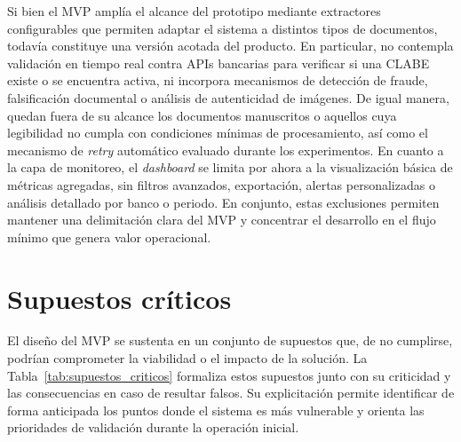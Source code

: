 Si bien el MVP amplía el alcance del prototipo mediante extractores configurables que permiten adaptar el sistema a distintos tipos de documentos, todavía constituye una versión acotada del producto. En particular, no contempla validación en tiempo real contra APIs bancarias para verificar si una CLABE existe o se encuentra activa, ni incorpora mecanismos de detección de fraude, falsificación documental o análisis de autenticidad de imágenes. De igual manera, quedan fuera de su alcance los documentos manuscritos o aquellos cuya legibilidad no cumpla con condiciones mínimas de procesamiento, así como el mecanismo de \textit{retry} automático evaluado durante los experimentos. En cuanto a la capa de monitoreo, el \textit{dashboard} se limita por ahora a la visualización básica de métricas agregadas, sin filtros avanzados, exportación, alertas personalizadas o análisis detallado por banco o periodo. En conjunto, estas exclusiones permiten mantener una delimitación clara del MVP y concentrar el desarrollo en el flujo mínimo que genera valor operacional.

\section{Supuestos críticos}

El diseño del MVP se sustenta en un conjunto de supuestos que, de no cumplirse, podrían comprometer la viabilidad o el impacto de la solución. La Tabla~\ref{tab:supuestos_criticos} formaliza estos supuestos junto con su criticidad y las consecuencias en caso de resultar falsos. Su explicitación permite identificar de forma anticipada los puntos donde el sistema es más vulnerable y orienta las prioridades de validación durante la operación inicial.

